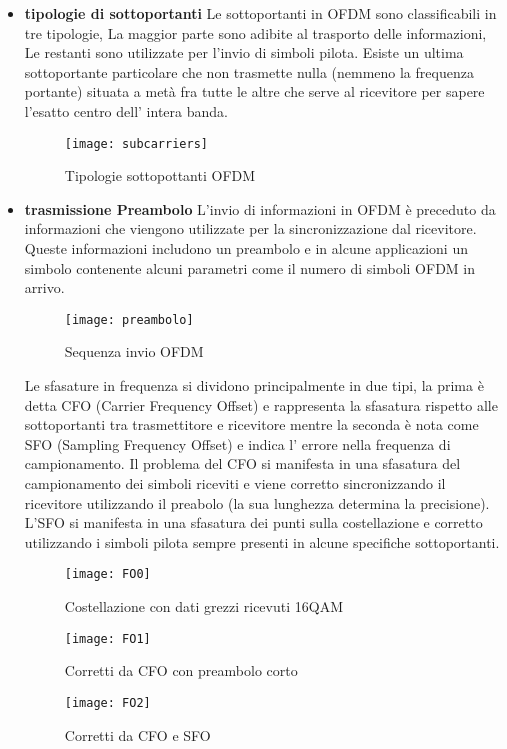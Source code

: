 \begin{itemize}
 \item \textbf{tipologie di sottoportanti}
 Le sottoportanti in OFDM sono classificabili in tre tipologie, La maggior parte sono adibite al trasporto delle informazioni, Le restanti sono utilizzate per l'invio di simboli pilota. Esiste un ultima sottoportante particolare che non trasmette nulla (nemmeno la frequenza portante) situata a metà fra tutte le altre che serve al ricevitore per sapere l'esatto centro dell' intera banda.
 \begin{figure}[h]
 	\centering
 	\texttt{[image: subcarriers]}
 	\caption{Tipologie sottopottanti OFDM \cite{subcarriers}}\label{fig:1}
 \end{figure}
 \item \textbf{trasmissione Preambolo}
	L'invio di informazioni in OFDM è preceduto da informazioni che viengono utilizzate per la sincronizzazione dal ricevitore. Queste informazioni includono un preambolo e in alcune applicazioni un simbolo contenente alcuni parametri come il numero di simboli OFDM in arrivo.
	\begin{figure}[h]
		\centering
		\texttt{[image: preambolo]}
		\caption{Sequenza invio OFDM \cite{subcarriers}}\label{fig:1}
	\end{figure}
 
  Le sfasature in frequenza si dividono principalmente in due tipi, la prima è detta CFO (Carrier Frequency Offset) e rappresenta la sfasatura rispetto alle sottoportanti tra trasmettitore e ricevitore mentre la seconda è nota come SFO (Sampling Frequency Offset) e indica l' errore nella frequenza di campionamento. Il problema del CFO si manifesta in una sfasatura del campionamento dei simboli riceviti e viene corretto sincronizzando il ricevitore utilizzando il preabolo (la sua lunghezza determina la precisione). L'SFO si manifesta in una sfasatura dei punti sulla costellazione e corretto utilizzando i simboli pilota sempre presenti in alcune specifiche sottoportanti. \cite{FOOFDM}

\begin{figure}[h]
	\centering
	\begin{minipage}[b]{.30\columnwidth}
		\texttt{[image: FO0]}
		\caption{Costellazione con dati grezzi ricevuti 16QAM}\label{fig:1}
	\end{minipage}\hfill
	\begin{minipage}[b]{.30\columnwidth}
		\texttt{[image: FO1]}
		\caption{Corretti da CFO con preambolo corto}\label{fig:1}
	\end{minipage}\hfill
	\begin{minipage}[b]{.30\columnwidth}
		\texttt{[image: FO2]}
		\caption{Corretti da CFO e SFO}\label{fig:1}
	\end{minipage}\hfill
	\cite{FOOFDM}
	\end{figure}
	

\end{itemize}
